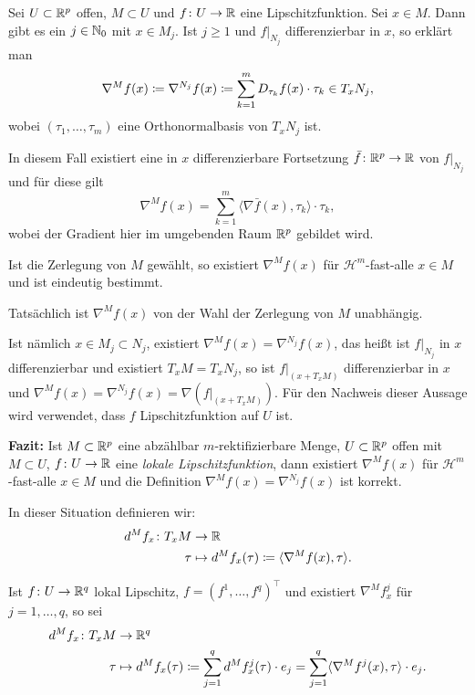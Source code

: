\documentclass[a4paper,twoside,DIV15,BCOR12mm]{scrbook}
\newcommand{\HM}{\mathscr H}
\begin{document}
Sei $U\subset\mathbb{R}^p$ offen, $M\subset U$ und $f\colon U\to \mathbb{R}$ eine Lipschitzfunktion. Sei $x\in M$. Dann gibt es ein $j\in\mathbb{N}_0$ mit $x\in M_j$. Ist $j\ge 1$ und $f|_{N_j}$ differenzierbar in $x$, so erklärt man
\[
\nabla^M f(x) \da \nabla^{N_j} f(x) \da \sum_{k=1}^m  D_{\tau_k}f(x) \cdot \tau_k  \in T_xN_j,
\]
wobei $(\tau_1,\ldots,\tau_m)$ eine Orthonormalbasis von $T_xN_j$ ist.

In diesem Fall existiert eine in $x$ differenzierbare Fortsetzung $\bar f\colon \mathbb{R}^p \to \mathbb{R}$ von $f|_{N_j}$ und für diese gilt 
\[
\nabla^M f(x) = \sum_{k=1}^m \langle \nabla\bar f(x), \tau_k\rangle \cdot \tau_k,
\]
wobei der Gradient hier im umgebenden Raum $\mathbb{R}^p$ gebildet wird.


\begin{bemerkungen}
\item Ist die Zerlegung von $M$ gewählt, so existiert $\nabla^Mf(x)$ für $\HM^m$-fast-alle $x\in M$ und ist eindeutig bestimmt.
\item Tatsächlich ist $\nabla^M f(x)$ von der Wahl der Zerlegung von $M$ unabhängig.

Ist nämlich $x\in M_j\subset N_j$, existiert $\nabla^M f(x) = \nabla^{N_j}f(x)$, das heißt ist $f|_{N_j}$ in $x$ differenzierbar und existiert $T_xM = T_xN_j$, so ist $f|_{(x+T_xM)}$ differenzierbar in $x$ und $\nabla^Mf(x) = \nabla^{N_j} f(x) = \nabla(f|_{(x+T_xM)})$. Für den Nachweis dieser Aussage wird verwendet, dass $f$ Lipschitzfunktion auf $U$ ist.
\end{bemerkungen}

\textbf{Fazit:} Ist $M\subset \mathbb{R}^p$ eine abzählbar $m$-rektifizierbare Menge, $U\subset\mathbb{R}^p$ offen mit $M\subset U$, $f\colon U\to \mathbb{R}$ eine {\em lokale Lipschitzfunktion}, dann existiert $\nabla^Mf(x)$ für $\HM^m$-fast-alle $x\in M$ und die Definition $\nabla^Mf(x) = \nabla^{N_j} f(x)$ ist korrekt. 

In dieser Situation definieren wir:
\begin{align*}
d^M f_x \colon T_xM &\to \MdR \\
\tau &\mapsto d^Mf_x(\tau) \da \langle \nabla^Mf(x), \tau\rangle.
\end{align*}

Ist $f\colon U\to\mathbb{R}^q$ lokal Lipschitz, $f=(f^1,\ldots,f^q)^\top$ und existiert $\nabla^Mf^j_x$ für $j=1,\ldots,q$, so sei 
\begin{align*}
d^M f_x \colon T_xM &\to \MdR^q \\
\tau &\mapsto d^Mf_x(\tau) \da \sum_{j=1}^q d^Mf^j_x(\tau) \cdot e_j = \sum_{j=1}^q \langle \nabla^Mf^j(x), \tau\rangle \cdot e_j.
\end{align*}
\end{document}
